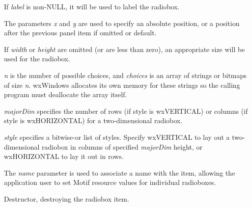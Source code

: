 If {\it label} is non-NULL, it will be used to label the radiobox.

The parameters {\it x} and {\it y} are used to specify an absolute
position, or a position after the previous panel item if omitted or
default.

If {\it width} or {\it height} are omitted (or are less than zero), an
appropriate size will be used for the radiobox.

{\it n} is the number of possible choices, and {\it choices} is an
array of strings or bitmaps of size {\it n}. wxWindows allocates its own memory
for these strings so the calling program must deallocate the array
itself.

{\it majorDim} specifies the number of rows (if style is wxVERTICAL) or columns (if style is wxHORIZONTAL) for a two-dimensional
radiobox.

{\it style} specifies a bitwise-or list of styles. Specify wxVERTICAL to lay
out a two-dimensional radiobox in columns of specified {\it majorDim} height, or wxHORIZONTAL to lay it out in rows.

The {\it name} parameter is used to associate a name with the item,
allowing the application user to set Motif resource values for
individual radioboxes.



Destructor, destroying the radiobox item.




